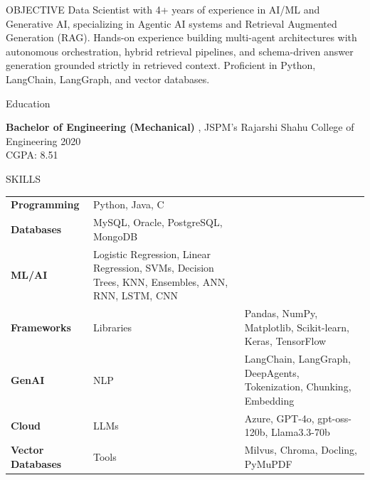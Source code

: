 \documentclass{resume}
\begin{document}
\begin{rSection}{OBJECTIVE}
{ Data Scientist with 4+ years of experience in AI/ML and Generative AI, specializing in Agentic AI systems and Retrieval Augmented Generation (RAG). Hands-on experience building multi-agent architectures with autonomous orchestration, hybrid retrieval pipelines, and schema-driven answer generation grounded strictly in retrieved context. Proficient in Python, LangChain, LangGraph, and vector databases. }
\end{rSection}

\begin{rSection}{Education}

{\bf Bachelor of Engineering (Mechanical) }, JSPM’s Rajarshi Shahu College of Engineering \hfill { 2020 }\\
CGPA: 8.51


\end{rSection}

\begin{rSection}{SKILLS}
\begin{tabular}{ @{} >{\bfseries}l @{\hspace{6ex}} l }

Programming & Python, Java, C \\

Databases & MySQL, Oracle, PostgreSQL, MongoDB \\

ML/AI & Logistic Regression, Linear Regression, SVMs, Decision Trees, KNN, Ensembles, ANN, RNN, LSTM, CNN \\

Frameworks & Libraries & Pandas, NumPy, Matplotlib, Scikit-learn, Keras, TensorFlow \\

GenAI & NLP & LangChain, LangGraph, DeepAgents, Tokenization, Chunking, Embedding \\

Cloud & LLMs & Azure, GPT-4o, gpt-oss-120b, Llama3.3-70b \\

Vector Databases & Tools & Milvus, Chroma, Docling, PyMuPDF \\

\end{tabular}
\end{rSection}
\end{document}
